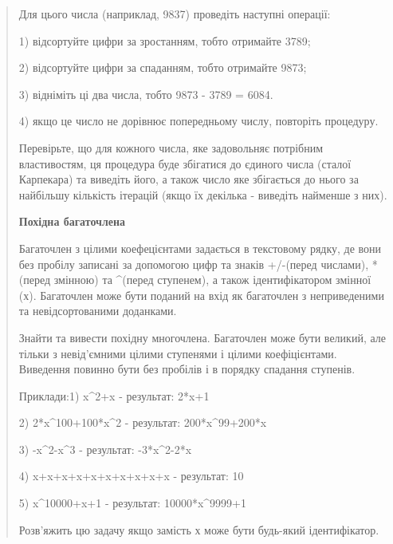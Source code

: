 \documentclass[]{article}
\begin{document}
\begin{quote}
Для цього числа (наприклад, 9837) проведіть наступні операції:

1) відсортуйте цифри за зростанням, тобто отримайте 3789;

2) відсортуйте цифри за спаданням, тобто отримайте 9873;

3) відніміть ці два числа, тобто 9873 - 3789 = 6084.

4) якщо це число не дорівнює попередньому числу, повторіть процедуру.

Перевірьте, що для кожного числа, яке задовольняє потрібним
властивостям, ця процедура буде збігатися до єдиного числа (сталої
Карпекара) та виведіть його, а також число яке збігається до нього за
найбільшу кількість ітерацій (якщо їх декілька - виведіть найменше з
них).

\textbf{Похідна багаточлена}

Багаточлен з цілими коефецієнтами задається в текстовому рядку, де вони
без пробілу записані за допомогою цифр та знаків +/-(перед числами),
*(перед змінною) та \^{}(перед ступенем), а також ідентифікатором
змінної (х). Багаточлен може бути поданий на вхід як багаточлен з
неприведеними та невідсортованими доданками.

Знайти та вивести похідну многочлена. Багаточлен може бути великий, але
тільки з невід'ємними цілими ступенями і цілими коефіцієнтами. Виведення
повинно бути без пробілів і в порядку спадання ступенів.

Приклади:1) x\^{}2+x - результат: 2*x+1

2) 2*x\^{}100+100*x\^{}2 - результат: 200*x\^{}99+200*x

3) -x\^{}2-x\^{}3 - результат: -3*x\^{}2-2*x

4) x+x+x+x+x+x+x+x+x+x - результат: 10

5) x\^{}10000+x+1 - результат: 10000*x\^{}9999+1

Розв'яжить цю задачу якщо замість х може бути будь-який ідентифікатор.
\end{quote}
\end{document}
